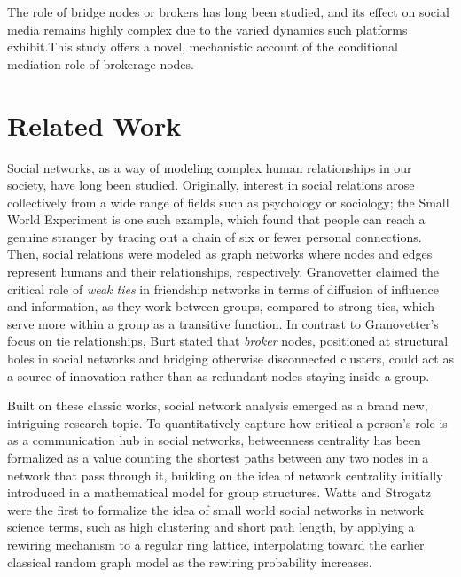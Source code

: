 \documentclass{svproc}
\def\Black{\color[rgb]{0,0,0}}
\begin{document}
%
\Black%
%


The role of bridge nodes or brokers has long been studied, and its
effect on social media remains highly complex due to the varied
dynamics such platforms exhibit.This study offers a novel, mechanistic
account of the conditional mediation role of brokerage nodes.


\section{Related Work}\label{sec:related}
Social networks, as a way of modeling complex human relationships
in our society, have long been studied.
Originally, interest in social relations arose collectively from
a wide range of fields such as psychology or sociology; the Small World Experiment
is one such example, which found that people can reach a genuine
stranger by tracing out a chain of six or fewer personal connections\cite{milgram1977}.
Then, social relations were modeled as graph networks
where nodes and edges represent humans and their relationships, respectively.
Granovetter\cite{granovetter1973} claimed the critical role of \emph{weak ties} in friendship networks
in terms of diffusion of influence and information, as they work between
groups, compared to strong ties, which serve more within a group as a
transitive function.
In contrast to Granovetter's focus on tie relationships, Burt\cite{burt1992}
stated that \emph{broker} nodes, positioned at structural holes in social
networks and bridging otherwise disconnected clusters, could
act as a source of innovation rather than as redundant nodes staying
inside a group.

Built on these classic works, social network analysis emerged as a
brand new, intriguing research topic.
To quantitatively capture how critical a person's role is as a communication hub
in social networks, betweenness centrality has been formalized as a
value counting the shortest paths between any two nodes in a network
that pass through it\cite{freeman1977}, building on the idea of network centrality
initially introduced in a mathematical model for group structures\cite{bavelas1948}.
Watts and Strogatz\cite{watts1998} were the first to formalize the idea of
small world social networks in network science terms, such as
high clustering and short path length, by applying a rewiring
mechanism to a regular ring lattice, interpolating toward the earlier
classical random graph model\cite{erdos1959} as the rewiring probability increases.
\end{document}
